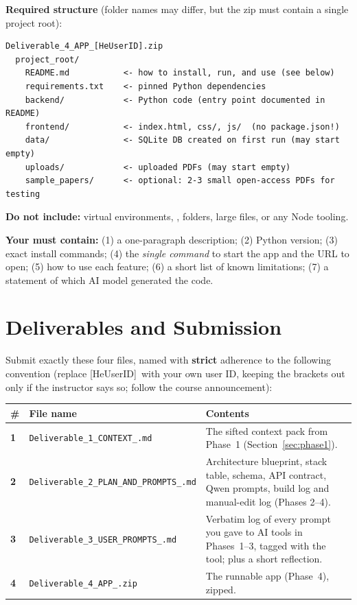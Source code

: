 \documentclass[11pt,a4paper]{article}
\newcommand{\uid}{[HeUserID]}
\newcommand{\dA}{\texttt{Deliverable\_1\_\allowbreak CONTEXT\_\allowbreak\uid.md}}
\newcommand{\dB}{\texttt{Deliverable\_2\_\allowbreak PLAN\_AND\_PROMPTS\_\allowbreak\uid.md}}
\newcommand{\dC}{\texttt{Deliverable\_3\_\allowbreak USER\_PROMPTS\_\allowbreak\uid.md}}
\newcommand{\dD}{\texttt{Deliverable\_4\_\allowbreak APP\_\allowbreak\uid.zip}}
\newcommand{\fn}[1]{\texttt{\detokenize{#1}}}
\begin{document}
\textbf{Required structure} (folder names may differ, but the zip must contain a single project root):
\begin{lstlisting}
Deliverable_4_APP_[HeUserID].zip
  project_root/
    README.md           <- how to install, run, and use (see below)
    requirements.txt    <- pinned Python dependencies
    backend/            <- Python code (entry point documented in README)
    frontend/           <- index.html, css/, js/  (no package.json!)
    data/               <- SQLite DB created on first run (may start empty)
    uploads/            <- uploaded PDFs (may start empty)
    sample_papers/      <- optional: 2-3 small open-access PDFs for testing
\end{lstlisting}
\textbf{Do not include:} virtual environments, \fn{__pycache__}, \fn{.git} folders, large files, or any Node tooling.

\textbf{Your \fn{README.md} must contain:} (1) a one-paragraph description; (2) Python version; (3) exact install commands; (4) the \emph{single command} to start the app and the URL to open; (5) how to use each feature; (6) a short list of known limitations; (7) a statement of which AI model generated the code.

\section{Deliverables and Submission}
\label{sec:deliverables}
Submit exactly these four files, named with \textbf{strict} adherence to the following convention (replace \uid\ with your own user ID, keeping the brackets out only if the instructor says so; follow the course announcement):

\begin{tabularx}{\textwidth}{@{}>{\bfseries}p{0.9cm}p{6.1cm}L@{}}
\toprule
\textbf{\#} & \textbf{File name} & \textbf{Contents}\\
 & \dA & The sifted context pack from Phase~1 (Section~\ref{sec:phase1}).\\
2 & \dB & Architecture blueprint, stack table, schema, API contract, Qwen prompts, build log and manual-edit log (Phases 2--4).\\
3 & \dC & Verbatim log of every prompt you gave to AI tools in Phases~1--3, tagged with the tool; plus a short reflection.\\
4 & \dD & The runnable app (Phase~4), zipped.\\
\bottomrule
\end{tabularx}
\end{document}
